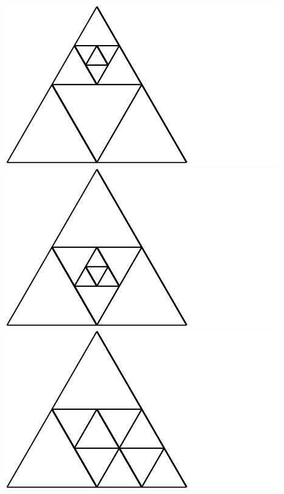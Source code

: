 \documentclass[12pt,amstags,fleqn]{article}
\theoremstyle{plain}
\theoremstyle{definition}
\begin{document}
\includegraphics{output-dissections-dissection10_i29_r2_c0.pdf}
\includegraphics{output-dissections-dissection10_i29_r2_c3.pdf}
\includegraphics{output-dissections-dissection10_i45_r3_c1.pdf}
\end{document}
